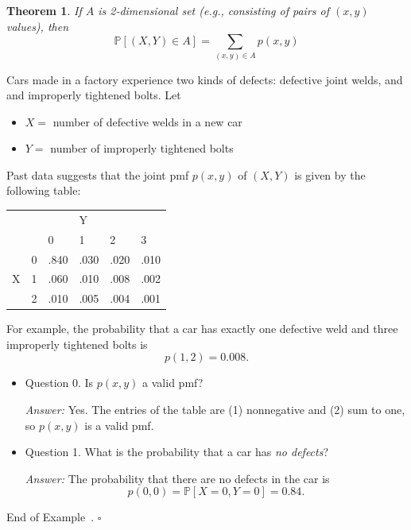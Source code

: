 \documentclass[10pt]{article}
\newtheorem{theorem}{Theorem}
\theoremstyle{definition}
\newtheorem{example}[theorem]{Example}
\renewenvironment{example}
{\begin{oldexample}}
  {\par\smallskip\hfill   End of Example~\theexample. $\square$    \par\end{oldexample}}
\newcommand{\1}[1]{\textbf{1}_{\left[#1\right]}} %
\def\P{\mathbb{P}} %
\begin{document}
\begin{theorem}
  If $A$ is 2-dimensional set (e.g., consisting of pairs
  of $(x,y)$ values), then
  \begin{equation*}
    \P\left[(X,Y)\in A\right] = \sum_{(x,y)\in A} p(x,y)
  \end{equation*}
\end{theorem}

\begin{example}
  Cars made in a factory experience two kinds of defects: defective joint welds, and and improperly
  tightened bolts. Let
  \begin{itemize}
    \item $X = $ number of defective welds in a new car
    \item $Y = $ number of improperly tightened bolts
  \end{itemize}
  Past data suggests that the joint pmf $p(x,y)$ of $(X,Y)$ is given by the following table:
  \begin{center}
    \begin{tabular}{ll|llll}
      &   & & \quad Y    \\
      &   & 0   & 1    & 2    & 3    \\ \hline
      & 0 & .840 & .030  & .020  & .010  \\
      X& 1 & .060 & .010  & .008 & .002 \\
      & 2 & .010 & .005 & .004 & .001
    \end{tabular}
  \end{center}

  For example, the probability that a car has exactly one defective weld and
  three improperly tightened bolts is
  \begin{equation*}
    p(1,2) = 0.008.
  \end{equation*}
  
  \begin{itemize}
    \item {Question 0.} Is $p(x,y)$ a valid pmf?

    \textit{Answer:} Yes. The entries of the table are (1) nonnegative and (2)
    sum to one, so $p(x,y)$ is a valid pmf.
    
    \item {Question 1.} What is the probability that a car has \textit{no defects}?

    \textit{Answer:} The probability that there are no defects in the car is
    \begin{equation*}
      p(0,0) = \P\left[X=0,Y=0 \right] = 0.84.
    \end{equation*}


\end{itemize}
\end{example}
\end{document}
